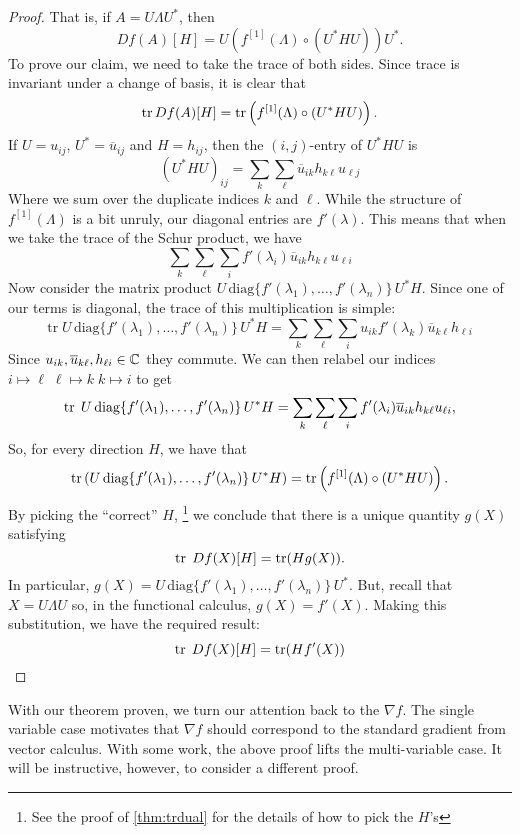 \begin{proof}
That is, if $A = U   \Lambda U ^{*} $, then
\[
  Df(A)[H] = U \left( f ^{[1]} (\Lambda) \circ (U ^{* } H U) \right)U ^{*}.
\]
%
To prove our claim, we need to take the trace of both sides. Since trace is
invariant under a change of basis, it is clear that
\[
  \operatorname{tr} Df(A)[H] = \operatorname{tr} \left( f ^{[1]} (\Lambda) \circ (U ^{* } H U) \right).
\]
If $U = u_{ij}$, $U ^{*} = \overline{u}_{ij}$ and $H = h_{ij}$, then the
$(i,j)$-entry of $U ^{*}HU$ is
\[
  {(U ^{* } H U)}_{ij} = \sum_k\sum_\ell \overline{u}_{ik}h_{k\ell}u_{\ell j}
\]
Where we sum over the duplicate indices $k$ and $\ell$. While the structure of
$f ^{[1]} (\Lambda)$ is a bit unruly, our diagonal entries are $f'(\lambda)$.
This means that when we take the trace of the Schur product, we have
\[
 \sum_k\sum_\ell \sum_i f'(\lambda_i)\overline{u}_{ik}h_{k\ell}u_{\ell i}
\]
Now consider the matrix product
$U\, \text{diag} \{f'(\lambda_1), \dots ,f'(\lambda_n)\} \,U ^{*} H $. Since one of our terms
is diagonal, the trace of this multiplication is simple:
\[
  \text{tr}\; U \,\text{diag} \{f'(\lambda_1), \dots ,f'(\lambda_n)\}\, U ^{*} H
  = \sum_k\sum_\ell\sum_i  u_{ik}f'(\lambda_k) \overline{u}_{k \ell} h_{\ell i}
\]
Since \(u_{ik}, \overline{u}_{k\ell}, h_{\ell i} \in \mathbb{C} \) they commute. We can
then relabel our indices
$i \mapsto \ell\; \ell \mapsto k \; k \mapsto i $ to get
\[
  \operatorname{tr}\; U \,\text{diag} \{f'(\lambda_1), \dots ,f'(\lambda_n)\}\, U ^{*} H
  = \sum_k\sum_\ell \sum_i f'(\lambda_i) \overline{u}_{i k} h_{k \ell}u_{\ell i},
\]
So, for every direction \(H\), we have that
\[
  \operatorname{tr} \left( U\, \text{diag} \{f'(\lambda_1), \dots ,f'(\lambda_n)\} \,U ^{*} H\right) =
  \operatorname{tr} \left( f ^{[1]} (\Lambda) \circ (U ^{* } H U) \right).
\]
By picking the ``correct'' \(H\),
\footnote{See the proof of \ref{thm:trdual} for the details of how to pick the
  \(H\)'s}
we conclude that there is a unique quantity \(g(X)\) satisfying
\[
  \operatorname{tr} \;Df(X)[H] = \operatorname{tr}(Hg(X)).
\]
In particular,
\( g(X) = U\, \text{diag} \{f'(\lambda_1), \dots ,f'(\lambda_n)\} \,U ^{*} \). But,
recall that \(X=U\Lambda U\) so, in the functional calculus, $g(X) = f'(X)$.
Making this substitution, we have the required result:
\[
  \operatorname{tr} \; Df(X)[H] = \operatorname{tr} (H f'(X))
\]
\end{proof}

With our theorem proven, we turn our attention back to the \(\nabla f\). The
single variable case motivates that \(\nabla f\) should correspond to the
standard gradient from vector calculus. With some work, the above proof lifts
the multi-variable case. It will be instructive, however, to consider a
different proof.

